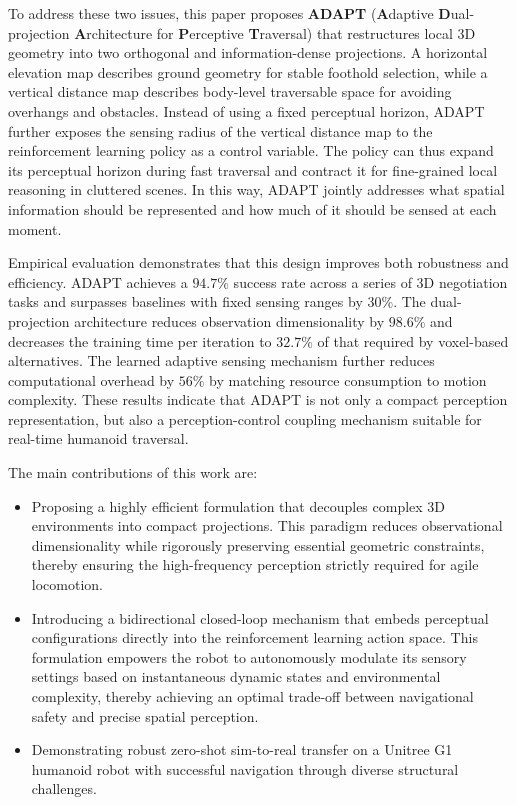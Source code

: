 To address these two issues, this paper proposes \textbf{ADAPT} (\textbf{A}daptive \textbf{D}ual-projection \textbf{A}rchitecture for \textbf{P}erceptive \textbf{T}raversal) that restructures local 3D geometry into two orthogonal and information-dense projections. A horizontal elevation map describes ground geometry for stable foothold selection, while a vertical distance map describes body-level traversable space for avoiding overhangs and obstacles. Instead of using a fixed perceptual horizon, ADAPT further exposes the sensing radius of the vertical distance map to the reinforcement learning policy as a control variable. The policy can thus expand its perceptual horizon during fast traversal and contract it for fine-grained local reasoning in cluttered scenes. In this way, ADAPT jointly addresses what spatial information should be represented and how much of it should be sensed at each moment.

Empirical evaluation demonstrates that this design improves both robustness and efficiency. ADAPT achieves a $94.7\%$ success rate across a series of 3D negotiation tasks and surpasses baselines with fixed sensing ranges by $30\%$. The dual-projection architecture reduces observation dimensionality by $98.6\%$ and decreases the training time per iteration to $32.7\%$ of that required by voxel-based alternatives. The learned adaptive sensing mechanism further reduces computational overhead by $56\%$ by matching resource consumption to motion complexity. These results indicate that ADAPT is not only a compact perception representation, but also a perception-control coupling mechanism suitable for real-time humanoid traversal.

The main contributions of this work are:
\begin{itemize}
    \item Proposing a highly efficient formulation that decouples complex 3D environments into compact projections. This paradigm reduces observational dimensionality while rigorously preserving essential geometric constraints, thereby ensuring the high-frequency perception strictly required for agile locomotion.
    \item Introducing a bidirectional closed-loop mechanism that embeds perceptual configurations directly into the reinforcement learning action space. This formulation empowers the robot to autonomously modulate its sensory settings based on instantaneous dynamic states and environmental complexity, thereby achieving an optimal trade-off between navigational safety and precise spatial perception.
    \item Demonstrating robust zero-shot sim-to-real transfer on a Unitree G1 humanoid robot with successful navigation through diverse structural challenges.
\end{itemize}
